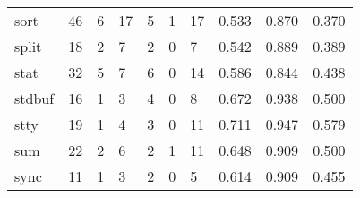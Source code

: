 \begin{longtable}{lp{2.0cm}p{2.0cm}p{2.0cm}p{2.0cm}p{2.0cm}p{2.0cm}p{2.0cm}p{2.0cm}p{2.0cm}}
sort      &                     46 &                                             6 &                                           17 &                                           5 &                                            1 &                                         17 &                                0.533 &                                  0.870 &                                0.370 \\
split     &                     18 &                                             2 &                                            7 &                                           2 &                                            0 &                                          7 &                                0.542 &                                  0.889 &                                0.389 \\
stat      &                     32 &                                             5 &                                            7 &                                           6 &                                            0 &                                         14 &                                0.586 &                                  0.844 &                                0.438 \\
stdbuf    &                     16 &                                             1 &                                            3 &                                           4 &                                            0 &                                          8 &                                0.672 &                                  0.938 &                                0.500 \\
stty      &                     19 &                                             1 &                                            4 &                                           3 &                                            0 &                                         11 &                                0.711 &                                  0.947 &                                0.579 \\
sum       &                     22 &                                             2 &                                            6 &                                           2 &                                            1 &                                         11 &                                0.648 &                                  0.909 &                                0.500 \\
sync      &                     11 &                                             1 &                                            3 &                                           2 &                                            0 &                                          5 &                                0.614 &                                  0.909 &                                0.455 \\

\end{longtable}
